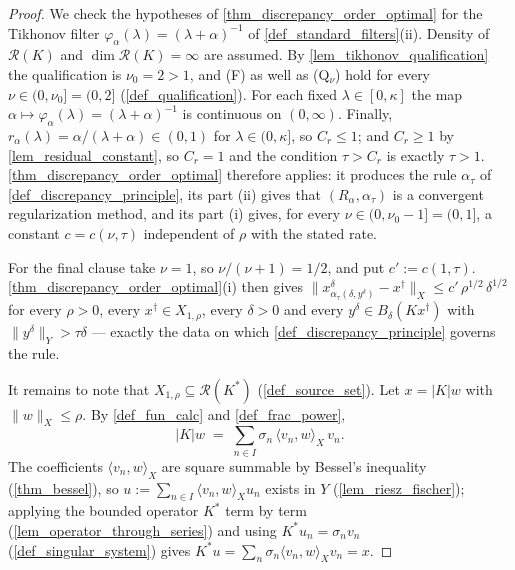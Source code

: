 \documentclass[a4paper]{report}
\theoremstyle{plain}
\theoremstyle{definition}
\theoremstyle{remark}
\newcommand{\Ran}{\mathcal{R}}
\newcommand{\dg}{^{\dagger}}
\begin{document}
\begin{proof}
  We check the hypotheses of \cref{thm_discrepancy_order_optimal} for the Tikhonov
  filter $\varphi_{\alpha}(\lambda) = (\lambda+\alpha)^{-1}$ of
  \cref{def_standard_filters}(ii).  Density of $\Ran(K)$ and $\dim\Ran(K) = \infty$ are
  assumed.  By
  \cref{lem_tikhonov_qualification} the qualification is $\nu_0 = 2 > 1$, and (F) as well
  as (Q$_{\nu}$) hold for every $\nu \in (0,\nu_0] = (0,2]$
  (\cref{def_qualification}).  For each fixed $\lambda \in [0,\kappa]$ the map
  $\alpha \mapsto \varphi_{\alpha}(\lambda) = (\lambda+\alpha)^{-1}$ is continuous on
  $(0,\infty)$.  Finally, $r_{\alpha}(\lambda) = \alpha/(\lambda+\alpha) \in (0,1)$ for
  $\lambda \in (0,\kappa]$, so $C_r \le 1$; and $C_r \ge 1$ by
  \cref{lem_residual_constant}, so $C_r = 1$ and the condition $\tau > C_r$ is exactly
  $\tau > 1$.  \cref{thm_discrepancy_order_optimal} therefore applies: it produces the
  rule $\alpha_{\tau}$ of \cref{def_discrepancy_principle}, its part (ii) gives that
  $(R_{\alpha},\alpha_{\tau})$ is a convergent regularization method, and its part (i)
  gives, for every $\nu \in (0,\nu_0-1] = (0,1]$, a constant $c = c(\nu,\tau)$
  independent of $\rho$ with the stated rate.

  For the final clause take $\nu = 1$, so $\nu/(\nu+1) = 1/2$, and put $c' := c(1,\tau)$.
  \cref{thm_discrepancy_order_optimal}(i) then gives
  $\|x^{\delta}_{\alpha_{\tau}(\delta,y^{\delta})} - x\dg\|_X \le
  c'\,\rho^{1/2}\,\delta^{1/2}$ for every $\rho > 0$, every $x\dg \in X_{1,\rho}$, every
  $\delta > 0$ and every $y^{\delta} \in B_{\delta}(Kx\dg)$ with
  $\|y^{\delta}\|_Y > \tau\delta$ --- exactly the data on which
  \cref{def_discrepancy_principle} governs the rule.

  It remains to note that $X_{1,\rho} \subseteq \Ran(K^{*})$
  (\cref{def_source_set}).  Let $x = |K|w$ with $\|w\|_X \le \rho$.  By
  \cref{def_fun_calc} and \cref{def_frac_power},
  \[
    |K|w \;=\; \sum_{n \in I} \sigma_n\,\langle v_n,w\rangle_X\, v_n .
  \]  The coefficients $\langle v_n,w\rangle_X$ are
  square summable by Bessel's inequality (\cref{thm_bessel}), so $u := \sum_{n \in I}
  \langle v_n,w\rangle_X u_n$ exists in $Y$ (\cref{lem_riesz_fischer}); applying the
  bounded operator $K^{*}$ term by term (\cref{lem_operator_through_series}) and using
  $K^{*}u_n = \sigma_n v_n$ (\cref{def_singular_system}) gives $K^{*}u = \sum_n
  \sigma_n\langle v_n,w\rangle_X v_n = x$.
\end{proof}
\end{document}

